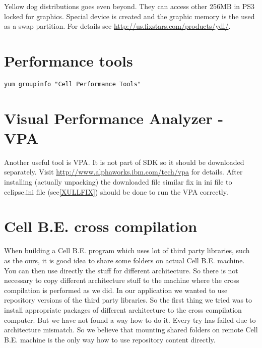 Yellow dog distributions goes even beyond. They can access other 256MB in PS3 locked for graphics.
Special device is created and the graphic memory is the used as a swap partition. For details see \url{http://us.fixstars.com/products/ydl/}.

\section{Performance tools}

\begin{verbatim}
yum groupinfo "Cell Performance Tools"
\end{verbatim}

\section{Visual Performance Analyzer - VPA}

Another useful tool is VPA. It is not part of SDK so it should be downloaded separately.
Visit \url{http://www.alphaworks.ibm.com/tech/vpa} for details.
After installing (actually unpacking) the downloaded file similar fix in ini file to eclipse.ini file (see\ref{XULLFIX}) should be done to run the VPA correctly.

\section{Cell B.E. cross compilation}


When building a Cell B.E. program which uses lot of third party libraries, such as the ours, it is good idea to share some folders on actual Cell B.E. machine.
You can then use directly the stuff for different architecture.
So there is not necessary to copy different architecture stuff to the machine where the cross compilation is performed as we did.
In our application we wanted to use repository versions of the third party libraries.
So the first thing we tried was to install appropriate packages of different architecture to the cross compilation computer.
But we have not found a way how to do it.
Every try has failed due to architecture mismatch.
So we believe that mounting shared folders on remote Cell B.E. machine is the only way how to use repository content directly.
